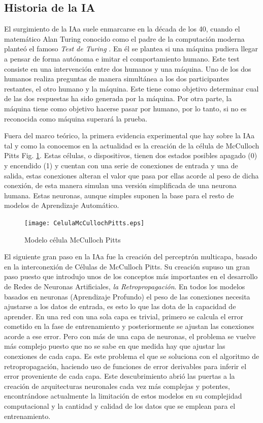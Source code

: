 \subsection{Historia de la IA}

El surgimiento de la \gls{IAa} suele enmarcarse en la década de los 40, cuando el
matemático Alan Turing conocido como el padre de la computación moderna planteó
el famoso \textit{Test de Turing} \cite{HarvardAIHistory}. En él se plantea si una máquina
pudiera llegar a pensar de forma autónoma e imitar el comportamiento humano.
Este test consiste en una intervención entre dos humanos y una máquina. Uno de
los dos humanos realiza preguntas de manera simultánea a los dos participantes
restantes, el otro humano y la máquina. Este tiene como objetivo determinar cual
de las dos respuestas ha sido generada por la máquina. Por otra parte, la
máquina tiene como objetivo hacerse pasar por humano, por lo tanto, si no es
reconocida como máquina superará la prueba. 

Fuera del marco teórico, la primera evidencia experimental que hay sobre la \gls{IAa}
tal y como la conocemos en la actualidad es la creación de la célula de
McCulloch Pitts Fig. \ref{Modelo_celula_McCulloch_Pitts}. Estas células, o
dispositivos, tienen dos estados posibles apagado (0) y encendido (1) y cuentan
con una serie de conexiones de entrada y una de salida, estas conexiones alteran
el valor que pasa por ellas acorde al peso de dicha conexión, de esta manera
simulan una versión simplificada de una neurona humana. Estas neuronas, aunque
simples suponen la base para el resto de modelos de Aprendizaje Automático.
\begin{figure}[ht]
    \texttt{[image: CelulaMcCullochPitts.eps]}
    \centering
	\captionsetup{justification=centering}
    \caption{Modelo célula McCulloch Pitts}
    \label{Modelo_celula_McCulloch_Pitts}
\end{figure}

El siguiente gran paso en la \gls{IAa} fue la creación del perceptrón multicapa, basado
en la interconexión de Células de McCulloch Pitts. Su creación supuso un gran
paso puesto que introdujo unos de los conceptos más importantes en el desarrollo
de Redes de Neuronas Artificiales, \textit{la Retropropagación}. En todos los
modelos basados en neuronas (Aprendizaje Profundo) el peso de las conexiones
necesita ajustarse a los datos de entrada, es esto lo que las dota de la
capacidad de aprender. En una red con una sola capa es trivial, primero se
calcula el error cometido en la fase de entrenamiento y posteriormente se
ajustan las conexiones acorde a ese error. Pero con más de una capa de neuronas,
el problema se vuelve más complejo puesto que no se sabe en que medida hay que
ajustar las conexiones de cada capa. Es este problema el que se soluciona con el
algoritmo de retropropagación, haciendo uso de funciones de error derivables
para inferir el error proveniente de cada capa. Este descubrimiento abrió las
puertas a la creación de arquitecturas neuronales cada vez más complejas y
potentes, encontrándose actualmente la limitación de estos modelos en su
complejidad computacional y la cantidad y calidad de los datos que se emplean
para el entrenamiento.

